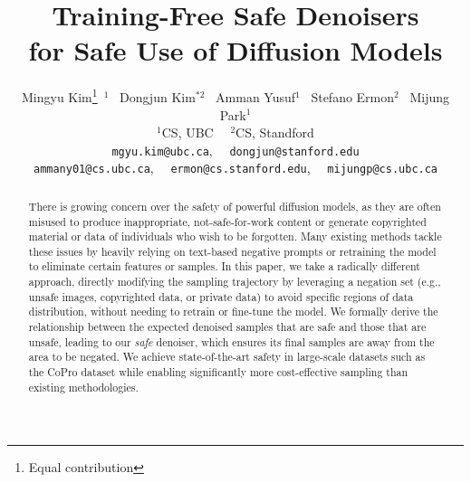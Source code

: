 \documentclass{article}
\title{Training-Free Safe Denoisers \\for Safe Use of Diffusion Models}
\author{%
  Mingyu Kim\thanks{Equal contribution}\ $^{1}$ \ Dongjun Kim$^{*2}$ \ Amman Yusuf$^1$ \ Stefano Ermon$^2$ \ Mijung Park$^1$\\
  $^1$CS, UBC \ \ $^2$CS, Standford\\
  \texttt{mgyu.kim@ubc.ca}, \ \ 
  \texttt{dongjun@stanford.edu} \\
  \texttt{ammany01@cs.ubc.ca},  \ \
  \texttt{ermon@cs.stanford.edu},  \ \
  \texttt{mijungp@cs.ubc.ca} \\
}
\begin{document}
\maketitle


\begin{abstract}
  There is growing concern over the safety of powerful diffusion models, as they are often misused to produce inappropriate, not-safe-for-work content or generate copyrighted material or data of individuals who wish to be forgotten. 
  Many existing methods tackle these issues by heavily relying on text-based negative prompts or retraining the model to eliminate certain features or samples. 
  In this paper, we take a radically different approach, directly modifying the sampling trajectory by leveraging a negation set (e.g., unsafe images, copyrighted data, or private data) to avoid specific regions of data distribution, without needing to retrain or fine-tune the model. 
  We formally derive the relationship between the expected denoised samples that are safe and those that are unsafe, leading to our \textit{safe} denoiser, which ensures its final samples are away from the area to be negated.
  We achieve state-of-the-art safety in large-scale datasets such as the CoPro dataset
  while enabling significantly more cost-effective sampling than existing methodologies.
\end{abstract}
\end{document}
